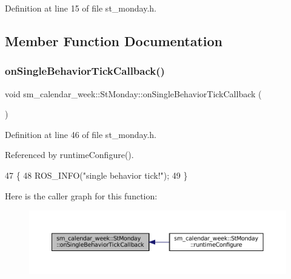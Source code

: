 Definition at line 15 of file st\+\_\+monday.\+h.



\subsection{Member Function Documentation}
\mbox{\label{structsm__calendar__week_1_1StMonday_aa87c025ae961c07bbcfc7af25b721f1e}} 
\subsubsection{\texorpdfstring{on\+Single\+Behavior\+Tick\+Callback()}{onSingleBehaviorTickCallback()}}
{\footnotesize\ttfamily void sm\+\_\+calendar\+\_\+week\+::\+St\+Monday\+::on\+Single\+Behavior\+Tick\+Callback (\begin{DoxyParamCaption}{ }\end{DoxyParamCaption})\hspace{0.3cm}{\ttfamily [inline]}}



Definition at line 46 of file st\+\_\+monday.\+h.



Referenced by runtime\+Configure().


\begin{DoxyCode}
47     \{
48         ROS\_INFO(\textcolor{stringliteral}{"single behavior tick!"});
49     \}
\end{DoxyCode}
Here is the caller graph for this function\+:
\nopagebreak
\begin{figure}[H]
\begin{center}
\leavevmode
\includegraphics[width=350pt]{structsm__calendar__week_1_1StMonday_aa87c025ae961c07bbcfc7af25b721f1e_icgraph}
\end{center}
\end{figure}
\mbox{\label{structsm__calendar__week_1_1StMonday_a7d1e6fe61b8618791254704a41cc1833}} 
